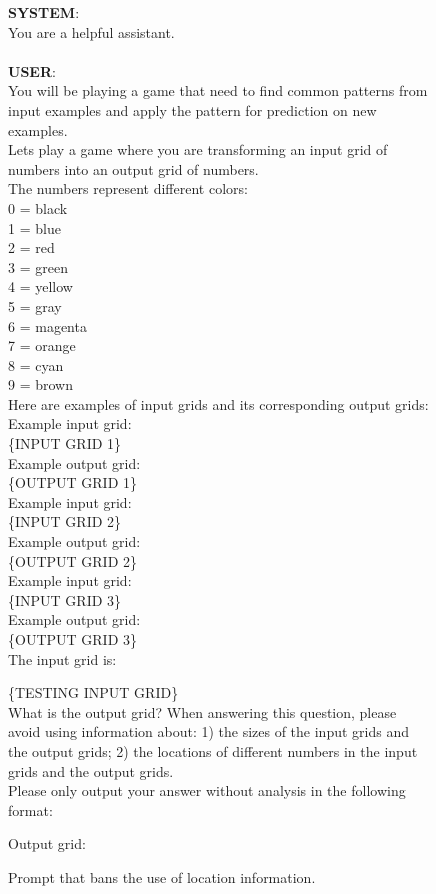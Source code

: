 \begin{figure*}
  \begin{tcolorbox}
  \textbf{SYSTEM}:\\
  You are a helpful assistant.\\\\
  \textbf{USER}: \\
        You will be playing a game that need to find common patterns from input examples and apply the pattern for prediction on new examples.\\
Lets play a game where you are transforming an input grid of numbers into an output grid of numbers.\\

The numbers represent different colors:\\
0 = black\\
1 = blue\\
2 = red\\
3 = green\\
4 = yellow\\
5 = gray\\
6 = magenta\\
7 = orange\\
8 = cyan\\
9 = brown\\

Here are examples of input grids and its corresponding output grids:\\
Example input grid:\\
\{INPUT GRID 1\} \\
Example output grid:\\
\{OUTPUT GRID 1\} \\

Example input grid:\\
\{INPUT GRID 2\} \\
Example output grid:\\
\{OUTPUT GRID 2\} \\

Example input grid:\\
\{INPUT GRID 3\} \\
Example output grid:\\
\{OUTPUT GRID 3\} \\

The input grid is:

\{TESTING INPUT GRID\} \\

What is the output grid? When answering this question, please avoid using information about: 1) the sizes of the input grids and the output grids; 2) the locations of different numbers in the input grids and the output grids. \\

Please only output your answer without analysis in the following format:

Output grid:

    \end{tcolorbox}
    \caption{Prompt that bans the use of location information.}
    \label{fig:without location prompt}
\end{figure*}

